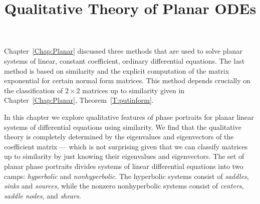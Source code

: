 \documentclass{ximera}
\title{Qualitative Theory of Planar ODEs}
\begin{document}
\begin{abstract}
\end{abstract}
\maketitle


\label{Chap:PlanarQ}

\normalsize

Chapter~\ref{Chap:Planar} discussed three methods that are used to solve
planar systems of linear, constant coefficient, ordinary differential
equations.  The last method is based on similarity and the explicit
computation of the matrix exponential for certain normal form matrices.
This method depends crucially on the classification of $2\times 2$ matrices
up to similarity given in Chapter~\ref{Chap:Planar}, 
Theorem~\ref{T:putinform}.

In this chapter we explore qualitative features of phase portraits for planar 
linear systems of differential equations using similarity.  We find that the 
qualitative theory is completely determined by the eigenvalues and 
eigenvectors of the coefficient matrix --- which is not surprising given
that we can classify matrices up to similarity by just knowing their
eigenvalues and eigenvectors.  The set of planar phase portraits divides 
systems of linear differential equations into two camps: {\em hyperbolic\/} 
and {\em nonhyperbolic\/}.  The hyperbolic systems consist of {\em saddles\/},
{\em sinks\/} and {\em sources\/}, while the nonzero nonhyperbolic systems 
consist of {\em centers\/}, {\em saddle nodes\/}, and {\em shears\/}.
\end{document}
